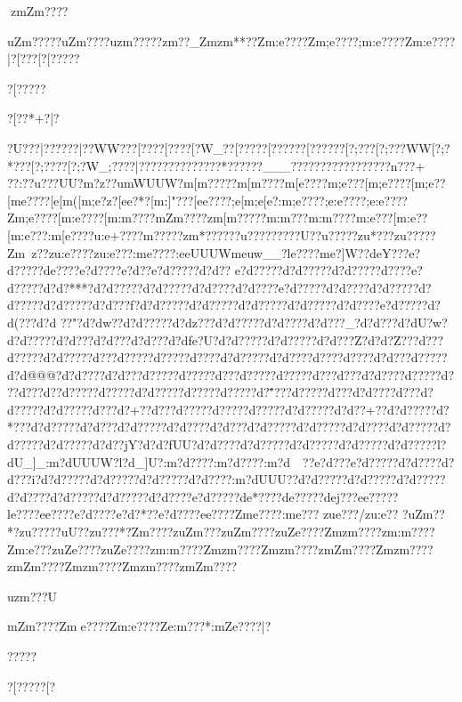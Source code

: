  zmZm????{uZm?????uZm????{uzm?????}zm??_Zmzm**??Zm:e????Zm;e????;m:e????Zm:e????|?[???[?[?????{?[?????{?[??*+?|?{?U???|?{?????|?{?WW??{?[???  {?[???{?[?W_?{?[?????[?{?????[?{?????[?;???[?;???WW[?;?*???[?;????[?;?W_;????|????   ??????????*??????___????????????}?????}n? ??}+
 ??}^^z??u?}??UU?}{m?z??{u{mWUUW?m[m?????m[m????{m[e????{m;e???[m;e????[m;e??[me????[e[m( [m;e?z?[ee?* ?[m:]"???[ee????;e[m   ;e[e ? :m;e????;e:e????;e:e????Zm;e????[m:e????[m:m????{mZm????zm[m?????m:m???{m:m????{m:e???[m:e??[m:e???:m[e????{u:e+????}{m?????}zm*??????u??????}???U??u?????}zu*???}zu?????}Zm~z??zu:e????zu:e???:me????:eeUUUWmeuw__?le????me?]W??deY???e?d?????de????e?d????e?d??e?d?????d?d?? e?d?????d?d?????d?d?????d?\ ???e?d?????d?d?***?d?d?????d?d?????d?d????d?d????e?d?????d?d????d?d?????d?d?????d?d?????d?d???f?d?d?????d?d?????d?d?????d?d?????d?d????e?d?????d?d(? ??d?d
??"?d?dw??d?d?????d?dz???d?d?????d?d????d?d???_?d?d???d?dU}?w?d?d?????d?d???d?d???d?d}???d?dfe?U?d?d?????d?d?????d?d???Z?d?d?Z???d?\???d?\?????d?d?????d?\???d?\?????d?\?????d?\????d?d?????d?d????d?\????d?\????d?d???d?\?????d?d@@ @?d?d????d?d???d?\?????d?\?????d?\???d?\?????d?\?????d?\???d?\???d?d????d?\?????d?\  ? ?d?\???d?\??d?\?????d?\?????d?d?????d?\?????d?\?????d?\""???d?\?????d?\???d?d????d?\???d?d?????d?d?????d?\???d?\?+??d?\???d?\?????d?\?????d?\?????d?d?????d?d??+??d?d?????d?\?*???d?d?????d?d???d?d?????d?d????d?d???d?d?????d?d?????d?d????d?d?????d?d?????d?d?????d?d??jY?d?d?fUU?d?d????d?d?????d?d?????d?d?????d?d?????l?dU_]_:m?dUUUW?l?d_]U?:m?d????:m?d????:m?d~~??e?d???e?d?????d?d????d?d???i?d?d?????d?d?????d?d?????d?d????:m?dUUU??d?d?????d?d?????d?d?????d?d????d?d?????d?d?????d?d????e?d?????de*????de?????dej???ee?????le????ee????e?d????e?d?*??e?d????ee????Zme????:me???
zue???/zu:e??
 ?uZm??* ?}zu????}?uU??zu?}??*?}Zm????zuZm ???zuZm????zuZe????Zmzm????zm:m????Zm:e ???zuZe????zuZe????zm:m????Zmzm????Zmzm????zmZm????Zmzm????zmZm????Zmzm????Zmzm????zmZm????{uzm???U{mZm????Zme????Zm:e????Ze:m???*:mZe????|?{?????{?[?????[?\?



}}}}}}}}
